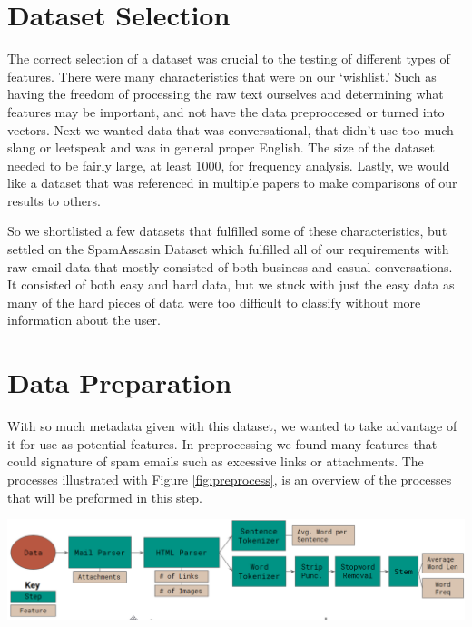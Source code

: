 \documentclass[12pt]{article}
\newenvironment{Figure}
  {\par\medskip\noindent\minipage{\linewidth}}
  {\endminipage\par\medskip}
\begin{document}
\begin{multicols}{2}
        \section{Dataset Selection}
            The correct selection of a dataset was crucial to the testing of 
            different types of features. There were many characteristics that were
            on our `wishlist.' Such as having the freedom of processing 
            the raw text ourselves and determining what features may be important, 
            and not have the data preproccesed or turned into vectors.
            Next we wanted data that was conversational, that didn't use too much 
            slang or leetspeak and was in general proper English. The size of the
            dataset needed to be fairly large, at least 1000, for frequency analysis.
            Lastly, we would like a dataset that was referenced in multiple papers to make comparisons
            of our results to others. 
            
            So we shortlisted a few datasets that fulfilled some of these characteristics, but
            settled on the SpamAssasin Dataset which fulfilled all of our requirements
            with raw email data that mostly consisted of both business and casual
            conversations. It consisted of both easy and hard data, but we stuck with
            just the easy data as many of the hard pieces of data were too difficult
            to classify without more information about the user.

        \section{Data Preparation}
            
            With so much metadata given with this dataset, we wanted to take advantage
            of it for use as potential features. In preprocessing we found many features
            that could signature of spam emails such as excessive links or attachments.
            The processes illustrated with Figure \ref{fig:preprocess}, is an overview
            of the processes that will be preformed in this step.


            \begin{Figure}
                \centering
                \includegraphics[width=\linewidth]{figures/prep.png}
                \label{fig:preprocess}
            \end{Figure}



\end{multicols}
\end{document}

